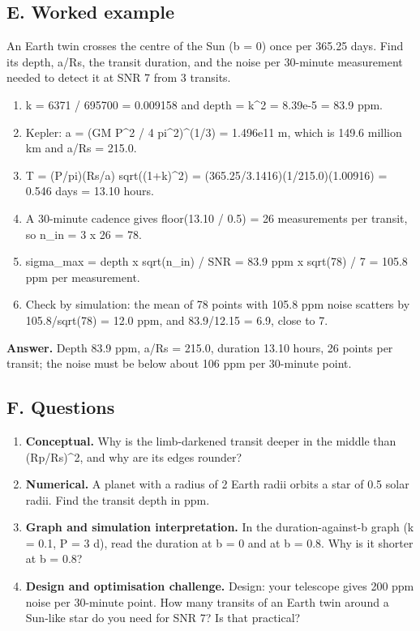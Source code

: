 \documentclass[11pt,a4paper]{article}
\begin{document}
\subsection*{E. Worked example}
An Earth twin crosses the centre of the Sun (b = 0) once per 365.25 days. Find its depth, a/Rs, the transit duration, and the noise per 30-minute measurement needed to detect it at SNR 7 from 3 transits.
\begin{enumerate}[nosep]
\item k = 6371 / 695700 = 0.009158 and depth = k\textasciicircum{}2 = 8.39e-5 = 83.9 ppm.
\item Kepler: a = (GM P\textasciicircum{}2 / 4 pi\textasciicircum{}2)\textasciicircum{}(1/3) = 1.496e11 m, which is 149.6 million km and a/Rs = 215.0.
\item T = (P/pi)(Rs/a) sqrt((1+k)\textasciicircum{}2) = (365.25/3.1416)(1/215.0)(1.00916) = 0.546 days = 13.10 hours.
\item A 30-minute cadence gives floor(13.10 / 0.5) = 26 measurements per transit, so n\_in = 3 x 26 = 78.
\item sigma\_max = depth x sqrt(n\_in) / SNR = 83.9 ppm x sqrt(78) / 7 = 105.8 ppm per measurement.
\item Check by simulation: the mean of 78 points with 105.8 ppm noise scatters by 105.8/sqrt(78) = 12.0 ppm, and 83.9/12.15 = 6.9, close to 7.
\end{enumerate}
\textbf{Answer.} Depth 83.9 ppm, a/Rs = 215.0, duration 13.10 hours, 26 points per transit; the noise must be below about 106 ppm per 30-minute point.

\subsection*{F. Questions}
\begin{enumerate}[nosep]
\item \textbf{Conceptual.} Why is the limb-darkened transit deeper in the middle than (Rp/Rs)\textasciicircum{}2, and why are its edges rounder?
\item \textbf{Numerical.} A planet with a radius of 2 Earth radii orbits a star of 0.5 solar radii. Find the transit depth in ppm.
\item \textbf{Graph and simulation interpretation.} In the duration-against-b graph (k = 0.1, P = 3 d), read the duration at b = 0 and at b = 0.8. Why is it shorter at b = 0.8?
\item \textbf{Design and optimisation challenge.} Design: your telescope gives 200 ppm noise per 30-minute point. How many transits of an Earth twin around a Sun-like star do you need for SNR 7? Is that practical?
\end{enumerate}
\end{document}
